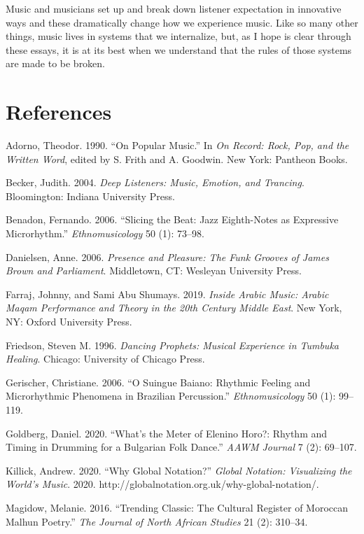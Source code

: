 \documentclass[twoside]{article}
\begin{document}
Music and musicians set up and break down listener expectation in
innovative ways and these dramatically change how we experience music.
Like so many other things, music lives in systems that we internalize,
but, as I hope is clear through these essays, it is at its best when we
understand that the rules of those systems are made to be broken.

\hypertarget{references}{%
\section*{References}\label{references}}

\begin{hangparas}{15pt}{1}

Adorno, Theodor. 1990. ``On Popular Music.'' In \emph{On Record: Rock,
Pop, and the Written Word}, edited by S. Frith and A. Goodwin. New York:
Pantheon Books.

Becker, Judith. 2004. \emph{Deep Listeners: Music, Emotion, and
Trancing}. Bloomington: Indiana University Press.

Benadon, Fernando. 2006. ``Slicing the Beat: Jazz Eighth-Notes as
Expressive Microrhythm.'' \emph{Ethnomusicology} 50 (1): 73--98.

Danielsen, Anne. 2006. \emph{Presence and Pleasure: The Funk Grooves of
James Brown and Parliament}. Middletown, CT: Wesleyan University Press.

Farraj, Johnny, and Sami Abu Shumays. 2019. \emph{Inside Arabic Music:
Arabic Maqam Performance and Theory in the 20th Century Middle East}.
New York, NY: Oxford University Press.

Friedson, Steven M. 1996. \emph{Dancing Prophets: Musical Experience in
Tumbuka Healing}. Chicago: University of Chicago Press.

Gerischer, Christiane. 2006. ``O Suingue Baiano: Rhythmic Feeling and
Microrhythmic Phenomena in Brazilian Percussion.''
\emph{Ethnomusicology} 50 (1): 99--119.

Goldberg, Daniel. 2020. ``What's the Meter of Elenino Horo?: Rhythm and
Timing in Drumming for a Bulgarian Folk Dance.'' \emph{AAWM Journal} 7
(2): 69--107.

Killick, Andrew. 2020. ``Why Global Notation?'' \emph{Global Notation:
Visualizing the World's Music}. 2020.
http://globalnotation.org.uk/why-global-notation/.

Magidow, Melanie. 2016. ``Trending Classic: The Cultural Register of
Moroccan Malhun Poetry.'' \emph{The Journal of North African Studies} 21
(2): 310--34.


\end{hangparas}
\end{document}
